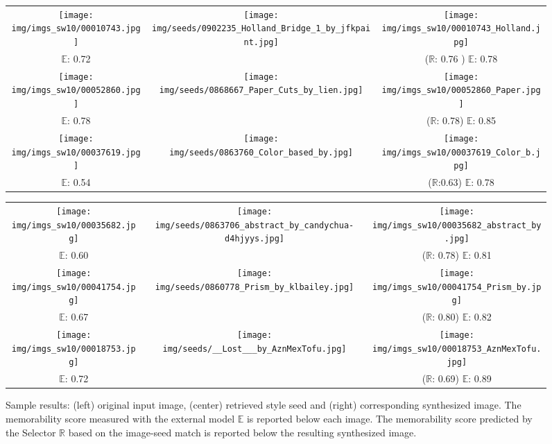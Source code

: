 \documentclass{sig-alternate-05-2015}
\begin{document}
\begin{figure*}[t]
\begin{tabular}{ccc} 
\texttt{[image: img/imgs\_sw10/00010743.jpg]} & 
\texttt{[image: img/seeds/0902235\_Holland\_Bridge\_1\_by\_jfkpaint.jpg]} & 
\texttt{[image: img/imgs\_sw10/00010743\_Holland.jpg]} 
\\
$\mathbb{E}$: 0.72 &  & ($\mathbb{R}$: 0.76 ) $\mathbb{E}$: 0.78  \\
\texttt{[image: img/imgs\_sw10/00052860.jpg]} & 
\texttt{[image: img/seeds/0868667\_Paper\_Cuts\_by\_lien.jpg]} & 
\texttt{[image: img/imgs\_sw10/00052860\_Paper.jpg]} 
\\
$\mathbb{E}$: 0.78 &  & ($\mathbb{R}$: 0.78) $\mathbb{E}$: 0.85 \\
\texttt{[image: img/imgs\_sw10/00037619.jpg]} &
\texttt{[image: img/seeds/0863760\_Color\_based\_by.jpg]} & 
\texttt{[image: img/imgs\_sw10/00037619\_Color\_b.jpg]} 
\\
$\mathbb{E}$: 0.54 &  & ($\mathbb{R}$:0.63) $\mathbb{E}$: 0.78 
\end{tabular}
\hspace{0.6cm}
\begin{tabular}{ccc} 
\texttt{[image: img/imgs\_sw10/00035682.jpg]} & 
\texttt{[image: img/seeds/0863706\_abstract\_by\_candychua-d4hjyys.jpg]} & 
\texttt{[image: img/imgs\_sw10/00035682\_abstract\_by.jpg]} 
\\
$\mathbb{E}$: 0.60 &  & ($\mathbb{R}$: 0.78) $\mathbb{E}$: 0.81   \\
\texttt{[image: img/imgs\_sw10/00041754.jpg]} & 
\texttt{[image: img/seeds/0860778\_Prism\_by\_klbailey.jpg]} & 
\texttt{[image: img/imgs\_sw10/00041754\_Prism\_by.jpg]} 
\\
$\mathbb{E}$: 0.67 &  & ($\mathbb{R}$: 0.80) $\mathbb{E}$: 0.82   \\
\texttt{[image: img/imgs\_sw10/00018753.jpg]} & 
\texttt{[image: img/seeds/\_\_Lost\_\_\_by\_AznMexTofu.jpg]} & 
\texttt{[image: img/imgs\_sw10/00018753\_AznMexTofu.jpg]} 
\\
$\mathbb{E}$: 0.72 &  & ($\mathbb{R}$: 0.69) $\mathbb{E}$: 0.89
\end{tabular}
\caption{Sample results: (left) original input image, (center) retrieved style seed and (right) corresponding synthesized image. The memorability score measured with the external model $\mathbb{E}$ is reported below each image. The memorability score predicted by the Selector $\mathbb{R}$ based on the image-seed match is reported below the resulting synthesized image.}
\label{fig:qualitative}
\end{figure*}





\end{document}

